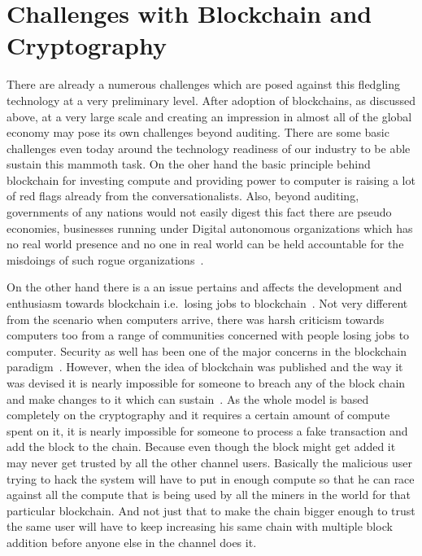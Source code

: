 \section{Challenges with Blockchain and Cryptography}

There are already a numerous challenges which are posed against this
fledgling technology at a very preliminary level. After adoption of
blockchains, as discussed above, at a very large scale and creating an
impression in almost all of the global economy may pose its own
challenges beyond auditing. There are some basic challenges even today
around the technology readiness of our industry to be able sustain
this mammoth task. On the oher hand the basic principle behind
blockchain for investing compute and providing power to computer is
raising a lot of red flags already from the conversationalists. Also,
beyond auditing, governments of any nations would not easily digest
this fact there are pseudo economies, businesses running under Digital
autonomous organizations which has no real world presence and no one
in real world can be held accountable for the misdoings of such rogue
organizations~\cite{myungsan33}.

On the other hand there is a an issue pertains and affects the
development and enthusiasm towards blockchain i.e.\ losing jobs to
blockchain~\cite{michael34}. Not very different from the scenario when
computers arrive, there was harsh criticism towards computers too from
a range of communities concerned with people losing jobs to computer.
Security as well has been one of the major concerns in the blockchain
paradigm~\cite{mauro35}. However, when the idea of blockchain was
published and the way it was devised it is nearly impossible for
someone to breach any of the block chain and make changes to it which
can sustain~\cite{bitcoin12}. As the whole model is based completely
on the cryptography and it requires a certain amount of compute spent
on it, it is nearly impossible for someone to process a fake
transaction and add the block to the chain. Because even though the
block might get added it may never get trusted by all the other
channel users. Basically the malicious user trying to hack the system
will have to put in enough compute so that he can race against all the
compute that is being used by all the miners in the world for that
particular blockchain. And not just that to make the chain bigger
enough to trust the same user will have to keep increasing his same
chain with multiple block addition before anyone else in the channel
does it.


